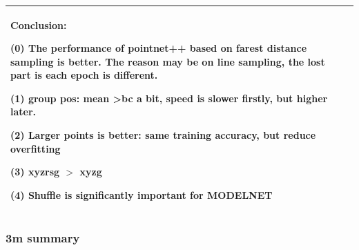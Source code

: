 \documentclass[,table,dvipsnames]{article}
\begin{document}
\begin{tabular}{|p{1.5cm}|p{1.5cm}|p{1cm}|p{1.5cm}|p{1.5cm}|p{1.5cm}|p{5cm}| }
	\multicolumn{7}{|p{16cm}|}{ Conclusion:\par	
		(0) The performance of pointnet++ based on farest distance sampling is better. The reason may be on line sampling, the lost part is each epoch is different.\par 
		(1) group pos: mean \textgreater bc a bit, speed is slower firstly, but higher later.\par
		(2) Larger points is better: same training accuracy, but reduce overfitting\par 
		(3) xyzrsg $>$ xyzg\par 
		(4) Shuffle is significantly important for MODELNET } \\
	\hline	
\end{tabular}

\subsubsection{3m summary}
\end{document}
